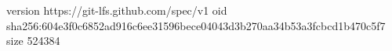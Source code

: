 version https://git-lfs.github.com/spec/v1
oid sha256:604e3f0c6852ad916c6ee31596bece04043d3b270aa34b53a3fcbcd1b470c5f7
size 524384
